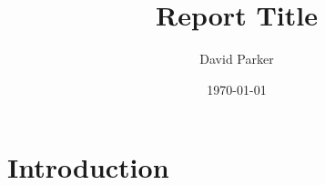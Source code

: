 \documentclass[12pt]{article}
\title{Report Title}
\author{David Parker}
\date{\today}
\numberwithin{equation}{section}
\begin{document}




\setcounter{tocdepth}{2}
\tableofcontents{}
\pagebreak



\section{Introduction} \label{sec:intro}

\end{document}

